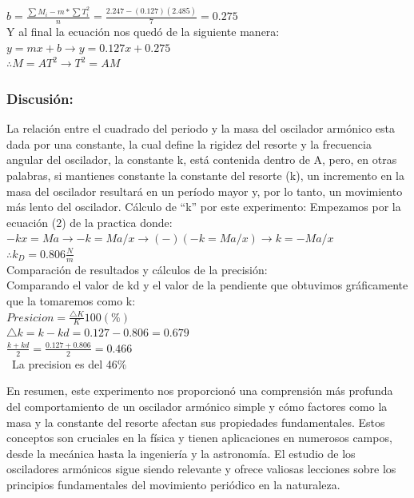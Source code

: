 \documentclass[10pt]{article}
\begin{document}
\begin{multicols}{2}
$b=\frac{\sum M_{i}-m*\sum T_{i}^{2}}{n}=\frac{2.247-(0.127)(2.485)}{7}=0.275$\\

Y al final la ecuación nos quedó de la siguiente manera:\\
$y=mx+b  \rightarrow  y=0.127x+0.275$\\
$\therefore M=AT^2    \rightarrow     T^2=AM$\\
\subsubsection{Discusión:}
La relación entre el cuadrado del periodo y la masa del oscilador armónico esta dada por una constante, la cual define la rigidez del resorte y la frecuencia angular del oscilador, la constante k, está contenida dentro de A, pero, en otras palabras, si mantienes constante la constante del resorte (k), un incremento en la masa del oscilador resultará en un período mayor y, por lo tanto, un movimiento más lento del oscilador.
Cálculo de “k” por este experimento:
Empezamos por la ecuación (2) de la practica donde:\\
$-kx=Ma     \rightarrow     -k=Ma/x       \rightarrow  (-)(-k=Ma/x)    \rightarrow     k=-Ma/x$\\
$\therefore k_{D} = 0.806 \frac{N}{m}$\\
Comparación de resultados y cálculos de la precisión:\\
Comparando el valor de kd y el valor de la pendiente que obtuvimos gráficamente que la tomaremos como k:\\
$Presicion = \frac{\bigtriangleup K}{K}100(\%)$\\
$\bigtriangleup k=k-kd=0.127-0.806=0.679$\\
$\frac{k+kd}{2}=\frac{0.127+0.806}{2}=0.466$\\\
La precision es del 46$\%$

En resumen, este experimento nos proporcionó una comprensión más profunda del comportamiento de un oscilador armónico simple y cómo factores como la masa y la constante del resorte afectan sus propiedades fundamentales. Estos conceptos son cruciales en la física y tienen aplicaciones en numerosos campos, desde la mecánica hasta la ingeniería y la astronomía. El estudio de los osciladores armónicos sigue siendo relevante y ofrece valiosas lecciones sobre los principios fundamentales del movimiento periódico en la naturaleza.


\end{multicols}
\end{document}
